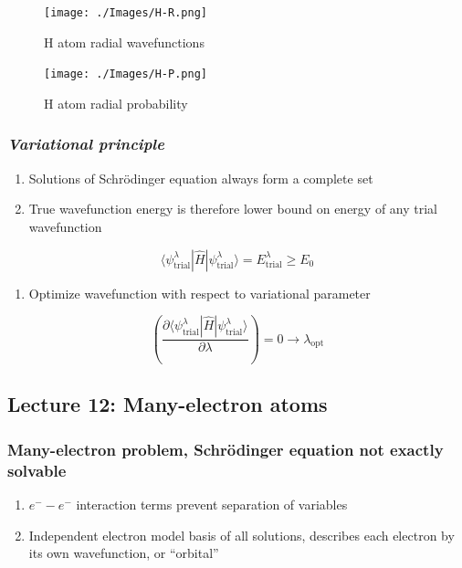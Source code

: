 \documentclass[11pt]{article}
\begin{document}
\begin{figure}[htbp]
\centering
\texttt{[image: ./Images/H-R.png]}
\caption{H atom radial wavefunctions}
\end{figure} 
\begin{figure}[htbp]
\centering
\texttt{[image: ./Images/H-P.png]}
\caption{H atom radial probability}
\end{figure} 

\subsubsection{\emph{Variational principle}}
\label{sec:orgf8d1b53}
\begin{enumerate}
\item Solutions of Schr\"{o}dinger equation always form a complete set
\item True wavefunction energy is therefore lower bound on energy of any trial wavefunction
\end{enumerate}
\[\langle \psi_\text{trial}^\lambda | \hat{H} | \psi_\text{trial}^\lambda\rangle =E_\text{trial}^\lambda \geq E_0\]
\begin{enumerate}
\item Optimize wavefunction with respect to variational parameter
\end{enumerate}
\[ \left ( \frac{\partial \langle \psi_\text{trial}^\lambda | \hat{H} | \psi_\text{trial}^\lambda\rangle}{\partial\lambda} \right ) = 0 \rightarrow \lambda_\text{opt} \] 

\subsection{Lecture 12: Many-electron atoms}
\label{sec:org08acb6e}
\subsubsection{Many-electron problem, Schr\"{o}dinger equation not exactly solvable}
\label{sec:org89e03d8}
\begin{enumerate}
\item \(e^- -e^-\) interaction terms prevent separation of variables
\item Independent electron model basis of all solutions, describes each electron by its own wavefunction, or ``orbital''
\end{enumerate}
\end{document}
